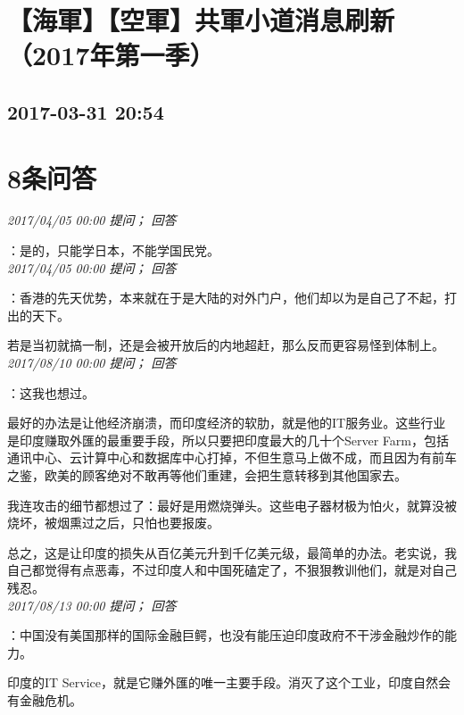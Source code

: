 \documentclass[twocolumn]{ctexart}
\begin{document}
\section{【海軍】【空軍】共軍小道消息刷新（2017年第一季）}
\subsection{2017-03-31 20:54}


\section{8条问答}

\textit{\hfill\noindent\small 2017/04/05 00:00 提问； 回答}

：是的，只能学日本，不能学国民党。\\

\textit{\hfill\noindent\small 2017/04/05 00:00 提问； 回答}

：香港的先天优势，本来就在于是大陆的对外门户，他们却以为是自己了不起，打出的天下。

若是当初就搞一制，还是会被开放后的内地超赶，那么反而更容易怪到体制上。\\

\textit{\hfill\noindent\small 2017/08/10 00:00 提问； 回答}

：这我也想过。

最好的办法是让他经济崩溃，而印度经济的软肋，就是他的IT服务业。这些行业是印度赚取外匯的最重要手段，所以只要把印度最大的几十个Server Farm，包括通讯中心、云计算中心和数据库中心打掉，不但生意马上做不成，而且因为有前车之鉴，欧美的顾客绝对不敢再等他们重建，会把生意转移到其他国家去。

我连攻击的细节都想过了：最好是用燃烧弹头。这些电子器材极为怕火，就算没被烧坏，被烟熏过之后，只怕也要报废。

总之，这是让印度的损失从百亿美元升到千亿美元级，最简单的办法。老实说，我自己都觉得有点恶毒，不过印度人和中国死磕定了，不狠狠教训他们，就是对自己残忍。\\

\textit{\hfill\noindent\small 2017/08/13 00:00 提问； 回答}

：中国没有美国那样的国际金融巨鳄，也没有能压迫印度政府不干涉金融炒作的能力。

印度的IT Service，就是它赚外匯的唯一主要手段。消灭了这个工业，印度自然会有金融危机。\\
\end{document}

